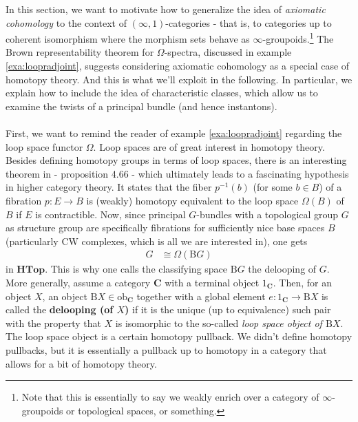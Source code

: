 In this section, we want to motivate how to generalize the idea of \textit{axiomatic cohomology} to the context of $(\infty,1)$-categories - that is, to categories up to coherent isomorphism where the {\glqq}morphism sets{\grqq} behave as $\infty$-groupoids.\footnote{Note that this is essentially to say we weakly enrich over a category of $\infty$-groupoids or topological spaces, or something.}
The Brown representability theorem for $\Omega$-spectra, discussed in example \ref{exa:loopradjoint}, suggests considering axiomatic cohomology as a special case of homotopy theory.
And this is what we'll exploit in the following.
In particular, we explain how to include the idea of characteristic classes, which allow us to examine the {\glqq}twists{\grqq} of a principal bundle (and hence instantons).
\\\\
First, we want to remind the reader of example \ref{exa:loopradjoint} regarding the loop space functor $\Omega$.
Loop spaces are of great interest in homotopy theory.
Besides defining homotopy groups in terms of loop spaces, there is an interesting theorem in \cite{8b5861fc} - proposition 4.66 - which ultimately leads to a fascinating hypothesis in higher category theory.
It states that the fiber $p^{-1}(b)$ (for some $b \in B$) of a fibration $p \colon E \rightarrow B$ is (weakly) homotopy equivalent to the loop space $\Omega(B)$ of $B$ if $E$ is contractible.
Now, since principal $G$-bundles with a topological group $G$ as structure group are specifically fibrations for sufficiently nice base spaces $B$ (particularly CW complexes, which is all we are interested in), one gets
\begin{align*}
  G
  &\cong
  \Omega(\mathrm{B}G)
\end{align*}
in $\mathbf{HTop}$.
This is why one calls the classifying space $\mathrm{B}G$ the delooping of $G$.
More generally, assume a category $\mathbf{C}$ with a terminal object $1_{\mathbf{C}}$.
Then, for an object $X$, an object $\mathrm{B}X \in \mathrm{ob}_{\mathbf{C}}$ together with a global element $e \colon 1_{\mathbf{C}} \rightarrow \mathrm{B}X$ is called the \textbf{delooping (of $X$)} if it is the unique (up to equivalence) such pair with the property that $X$ is isomorphic to the so-called \textit{loop space object of $\mathrm{B}X$}.
The loop space object is a certain homotopy pullback.
We didn't define homotopy pullbacks, but it is essentially a pullback up to homotopy in a category that allows for a bit of homotopy theory.
